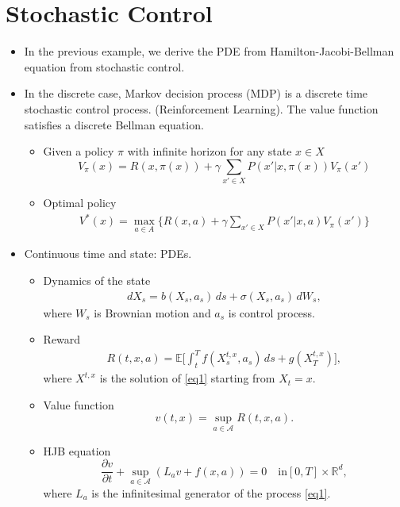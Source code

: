 \documentclass{beamer}
\begin{document}
\section{Stochastic Control}
\begin{frame}
\begin{itemize}
\item In the previous example, we derive the PDE from {\color{red}Hamilton-Jacobi-Bellman} equation from stochastic control. 
\pause
\item In the discrete case, Markov decision process (MDP) is a discrete time stochastic control process. (Reinforcement Learning).   The value function satisfies a discrete Bellman equation.
\pause
\begin{itemize}
\item Given a policy $\pi$ with infinite horizon for any state $x\in X$
\begin{equation*}
V_\pi(x) = R(x,\pi(x)) + \gamma\sum_{x'\in X}P(x'|x,\pi(x))V_{\pi}(x')
\end{equation*}
\item Optimal policy
\begin{align*}
V^\ast(x) = \max_{a\in A}\{R(x,a) + \gamma\sum_{x'\in X}P(x'|x,a)V_{\pi}(x')\}
\end{align*}
\end{itemize}

\end{itemize} 
\end{frame}

\begin{frame}
\begin{itemize}
\item Continuous time and state: PDEs. 
\begin{itemize}
\item Dynamics of the state
\begin{align}\label{eq1}
dX_s = b(X_s,a_s)\,ds + \sigma(X_s,a_s)\,dW_s,
\end{align}
where $W_s$ is Brownian motion and $a_s$ is control process.
\pause
\item Reward 
\begin{align*}
R(t,x,a) = \mathbb{E}\big[\int_t^Tf(X_s^{t,x},a_s)\,ds + g(X_T^{t,x})\big],
\end{align*}
where $X^{t,x}$ is the solution of \eqref{eq1} starting from $X_t = x$.
\pause
\item Value function 
$$v(t,x) = \sup_{a\in \mathcal{A}}R(t,x,a).$$
\pause
\item HJB equation 
$$\frac{\partial v}{\partial t} + \sup_{a\in \mathcal{A}}(L_a v + f(x,a)) = 0\quad \text{in} [0,T]\times \mathbb{R}^d,$$
where $L_a$ is the infinitesimal generator of the process \eqref{eq1}. 
\end{itemize}
\end{itemize}

\end{frame}
\end{document}
